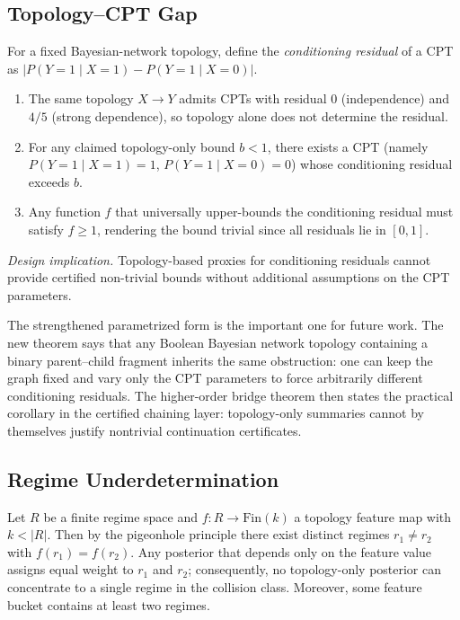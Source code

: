 \documentclass[11pt,openany]{report}
\begin{document}
\subsection*{Topology--CPT Gap}

\boundarystart
\begin{theorem}
\label{thm:topology-cpt-gap}
For a fixed Bayesian-network topology, define the \emph{conditioning
residual} of a CPT as $|P(Y{=}1 \mid X{=}1) - P(Y{=}1 \mid X{=}0)|$.
\begin{enumerate}
  \item The same topology $X \to Y$ admits CPTs with residual $0$ (independence)
  and $4/5$ (strong dependence), so topology alone does not determine the
  residual.
  \item For any claimed topology-only bound $b < 1$, there exists a CPT
  (namely $P(Y{=}1 \mid X{=}1) = 1$, $P(Y{=}1 \mid X{=}0) = 0$) whose
  conditioning residual exceeds $b$.
  \item Any function $f$ that universally upper-bounds the conditioning
  residual must satisfy $f \ge 1$, rendering the bound trivial since all
  residuals lie in $[0,1]$.
\end{enumerate}
\end{theorem}
\boundaryend

\textit{Design implication.}  Topology-based proxies for conditioning
residuals cannot provide certified non-trivial bounds without additional
assumptions on the CPT parameters.

The strengthened parametrized form is the important one for future work.  The
new theorem
 says that any
Boolean Bayesian network topology containing a binary parent--child fragment
inherits the same obstruction: one can keep the graph fixed and vary only the
CPT parameters to force arbitrarily different conditioning residuals.  The
higher-order bridge theorem  then
states the practical corollary in the certified chaining layer: topology-only
summaries cannot by themselves justify nontrivial continuation certificates.

\subsection*{Regime Underdetermination}

\boundarystart
\begin{theorem}
\label{thm:regime-underdetermination}
Let $R$ be a finite regime space and $f : R \to \mathrm{Fin}(k)$ a topology
feature map with $k < |R|$.  Then by the pigeonhole principle there exist
distinct regimes $r_1 \ne r_2$ with $f(r_1) = f(r_2)$.  Any posterior that
depends only on the feature value assigns equal weight to $r_1$ and $r_2$;
consequently, no topology-only posterior can concentrate to a single regime
in the collision class.  Moreover, some feature bucket contains at least two
regimes.
\end{theorem}
\boundaryend
\end{document}
